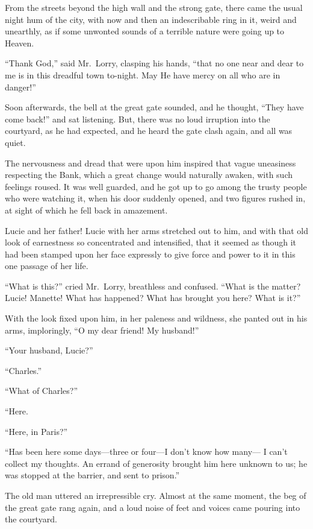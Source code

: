 From the streets beyond the high wall and the strong gate, there came
the usual night hum of the city, with now and then an indescribable
ring in it, weird and unearthly, as if some unwonted sounds of a
terrible nature were going up to Heaven.

``Thank God,'' said Mr.\ Lorry, clasping his hands, ``that no one near
and dear to me is in this dreadful town to-night.  May He have mercy
on all who are in danger!''

Soon afterwards, the bell at the great gate sounded, and he thought,
``They have come back!'' and sat listening.  But, there was no loud
irruption into the courtyard, as he had expected, and he heard the
gate clash again, and all was quiet.

The nervousness and dread that were upon him inspired that vague
uneasiness respecting the Bank, which a great change would naturally
awaken, with such feelings roused.  It was well guarded, and he got
up to go among the trusty people who were watching it, when his door
suddenly opened, and two figures rushed in, at sight of which he fell
back in amazement.

Lucie and her father!  Lucie with her arms stretched out to him, and
with that old look of earnestness so concentrated and intensified,
that it seemed as though it had been stamped upon her face expressly
to give force and power to it in this one passage of her life.

``What is this?'' cried Mr.\ Lorry, breathless and confused.
``What is the matter?  Lucie!  Manette!  What has happened?  What has
brought you here?  What is it?''

With the look fixed upon him, in her paleness and wildness,
she panted out in his arms, imploringly, ``O my dear friend!
My husband!''

``Your husband, Lucie?''

``Charles.''

``What of Charles?''

``Here.

``Here, in Paris?''

``Has been here some days---three or four---I don't know how many---%
I can't collect my thoughts.  An errand of generosity brought him
here unknown to us; he was stopped at the barrier, and sent to prison.''

The old man uttered an irrepressible cry.  Almost at the same moment,
the beg of the great gate rang again, and a loud noise of feet and
voices came pouring into the courtyard.

